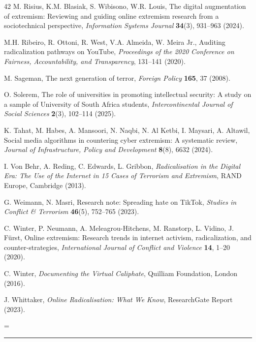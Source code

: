 \documentclass[10pt]{NSP1}
\begin{document}
\begin{thebibliography}{42}
		 M. Risius, K.M. Blasiak, S. Wibisono, W.R. Louis, The digital augmentation of extremism: Reviewing and guiding online extremism research from a sociotechnical perspective, \textit{Information Systems Journal} \textbf{34}(3), 931–963 (2024).
		
		 M.H. Ribeiro, R. Ottoni, R. West, V.A. Almeida, W. Meira Jr., Auditing radicalization pathways on YouTube, \textit{Proceedings of the 2020 Conference on Fairness, Accountability, and Transparency}, 131–141 (2020).
		
		 M. Sageman, The next generation of terror, \textit{Foreign Policy} \textbf{165}, 37 (2008).
		
		 O. Solerem, The role of universities in promoting intellectual security: A study on a sample of University of South Africa students, \textit{Intercontinental Journal of Social Sciences} \textbf{2}(3), 102–114 (2025).
		
		 K. Tahat, M. Habes, A. Mansoori, N. Naqbi, N. Al Ketbi, I. Maysari, A. Altawil, Social media algorithms in countering cyber extremism: A systematic review, \textit{Journal of Infrastructure, Policy and Development} \textbf{8}(8), 6632 (2024).
		
		 I. Von Behr, A. Reding, C. Edwards, L. Gribbon, \textit{Radicalisation in the Digital Era: The Use of the Internet in 15 Cases of Terrorism and Extremism}, RAND Europe, Cambridge (2013).
		
		 G. Weimann, N. Masri, Research note: Spreading hate on TikTok, \textit{Studies in Conflict \& Terrorism} \textbf{46}(5), 752–765 (2023).
		
		 C. Winter, P. Neumann, A. Meleagrou-Hitchens, M. Ranstorp, L. Vidino, J. F\"urst, Online extremism: Research trends in internet activism, radicalization, and counter-strategies, \textit{International Journal of Conflict and Violence} \textbf{14}, 1–20 (2020).
		
		 C. Winter, \textit{Documenting the Virtual Caliphate}, Quilliam Foundation, London (2016).
		
		 J. Whittaker, \textit{Online Radicalisation: What We Know}, ResearchGate Report (2023).
		
	\end{thebibliography}
\emergencystretch=\hsize

\begin{center}
	\rule{6 cm}{0.02 cm}
\end{center}
\end{document}
